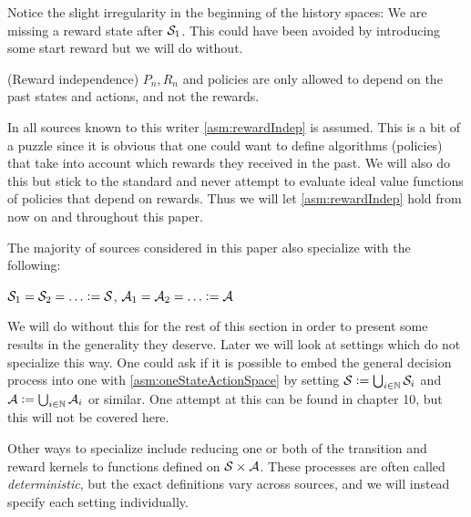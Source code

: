Notice the slight irregularity in the beginning of the history spaces:
We are missing a reward state after $\mathcal{S}_1$. This could have been avoided
by introducing some start reward but we will do without.

\begin{asm}(Reward independence)
  $P_n, R_n$ and policies are only allowed to depend on the past
  states and actions, and not the rewards.
  \label{asm:rewardIndep}
\end{asm}

In all sources known to this writer \cref{asm:rewardIndep} is assumed.
This is a bit of a puzzle since it is obvious that one could
want to define algorithms (policies) that take into account which rewards
they received in the past.
We will also do this but stick to the standard and 
never attempt to evaluate ideal value functions of
policies that depend on rewards.
Thus we will let \cref{asm:rewardIndep} hold
from now on and throughout this paper.

The majority of sources considered in this paper also specialize
with the following:
\begin{asm}
  $\Cal{S}_1 = \Cal{S}_2 = \dots \defeq \Cal{S}$,
  $\Cal{A}_1 = \Cal{A}_2 = \dots \defeq \Cal{A}$
  \label{asm:oneStateActionSpace}
\end{asm}
We will do without this for the rest of this section in order to
present some results in the generality they deserve.
Later we will look at settings which do not specialize this way.
One could ask if it is possible to embed the general decision process into one
with \cref{asm:oneStateActionSpace} by setting
$\mathcal{S} \vcentcolon= \bigcup_{i\in\mathbb{N}} \mathcal{S}_i$ and
$\mathcal{A} \vcentcolon= \bigcup_{i\in\mathbb{N}} \mathcal{A}_i$ or similar.
One attempt at this can be found in  chapter 10,
but this will not be covered here. %

Other ways to specialize include reducing one or both of the
transition and reward kernels to functions defined on
$\mathcal{S} \times \mathcal{A}$. These processes are often called
\emph{deterministic}, but the exact definitions vary across sources, and we will
instead specify each setting individually.

